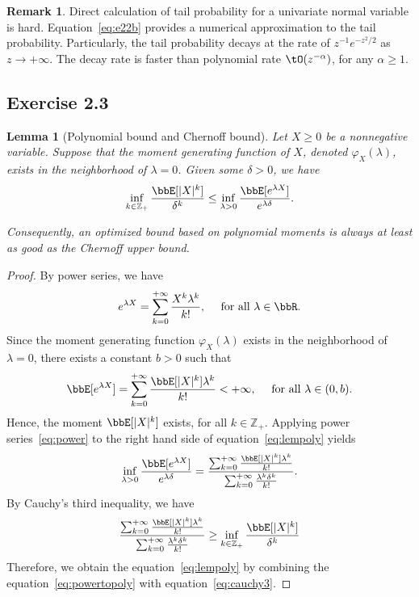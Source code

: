 \documentclass[11pt]{article}
\theoremstyle{plain}
\newtheorem{lem}{Lemma}
\theoremstyle{definition}
\newtheorem{rmk}{Remark}
\begin{document}
\begin{rmk}
	Direct calculation of tail probability for a univariate normal variable is hard. Equation~\eqref{eq:e22b} provides a numerical approximation to the tail probability. Particularly, the tail probability decays at the rate of $z^{-1}e^{-z^2/2}$ as $z \rightarrow +\infty$. The decay rate is faster than polynomial rate $\tO(z^{-\alpha})$, for any $\alpha \geq 1$.
\end{rmk}

\subsection{Exercise 2.3}

\begin{lem}[Polynomial bound and Chernoff bound]\label{lem:momcher}
	Let $X \geq 0$ be a nonnegative variable. Suppose that the moment generating function of $X$, denoted $\varphi_{X}(\lambda)$, exists in the neighborhood of $\lambda = 0$. Given some $\delta > 0$, we have
	\begin{equation}\label{eq:lempoly}
		\inf_{k \in \mathbb{Z_+} } \frac{\bbE[|X|^k]}{\delta^k} \leq \inf_{\lambda >0} \frac{\bbE[e^{\lambda X}]}{e^{\lambda \delta}}. 
	\end{equation}
	  
	Consequently, an optimized bound based on polynomial moments is always at least as good as the Chernoff upper bound.
\end{lem}

\begin{proof}
	By power series, we have
	\begin{equation}\label{eq:power}
		 e^{\lambda X} = \sum_{k = 0}^{+\infty } \frac{X^k \lambda^k }{k!}, \quad \text{ for all } \lambda \in \bbR.
	\end{equation}
	Since the moment generating function $\varphi_X(\lambda)$ exists in the neighborhood of $\lambda = 0$, there exists a constant $b > 0$ such that 
		\[   \bbE [e^{\lambda X} ]= \sum_{k = 0}^{+\infty } \frac{ \bbE[|X|^k]  \lambda^k }{k!} < +\infty,\quad \text{ for all } \lambda \in (0,b). \]
	 Hence, the moment  $\bbE[|X|^k]$ exists, for all $ k \in \mathbb{Z_+}$. Applying power series~\eqref{eq:power} to the right hand side of equation~\eqref{eq:lempoly} yields
	\begin{equation}\label{eq:powertopoly}
		\inf_{\lambda >0} \frac{\bbE[e^{\lambda X}]}{e^{\lambda \delta}} = \frac{ \sum_{k = 0}^{+\infty } \frac{ \bbE[|X|^k]  \lambda^k }{k!} }{ \sum_{k = 0}^{+\infty } \frac{\lambda^k \delta^k }{k!}  }.	\end{equation}
	By Cauchy's third inequality, we have
	\begin{equation}\label{eq:cauchy3}
		\frac{ \sum_{k = 0}^{+\infty } \frac{ \bbE[|X|^k]  \lambda^k }{k!} }{ \sum_{k = 0}^{+\infty } \frac{\lambda^k \delta^k }{k!}  } \geq \inf_{k \in \mathbb{Z}_{+} } \frac{\bbE[|X|^k]}{\delta^k}  
	\end{equation}
	Therefore, we obtain the equation~\eqref{eq:lempoly} by combining the equation~\eqref{eq:powertopoly} with equation~\eqref{eq:cauchy3}.	
\end{proof}
\end{document}

